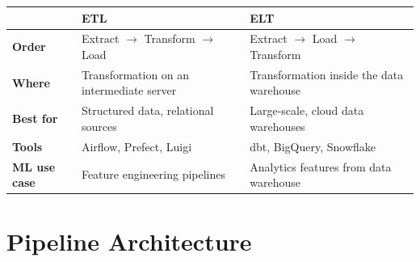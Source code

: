 \begin{center}
\begin{tabular}{@{}lp{5.5cm}p{5.5cm}@{}}
\toprule
& \textbf{ETL} & \textbf{ELT} \\
\midrule
\textbf{Order} & Extract $\to$ Transform $\to$ Load &
  Extract $\to$ Load $\to$ Transform \\
\textbf{Where} & Transformation on an intermediate server &
  Transformation inside the data warehouse \\
\textbf{Best for} & Structured data, relational sources &
  Large-scale, cloud data warehouses \\
\textbf{Tools} & Airflow, Prefect, Luigi &
  dbt, BigQuery, Snowflake \\
\textbf{ML use case} & Feature engineering pipelines &
  Analytics features from data warehouse \\
\bottomrule
\end{tabular}
\end{center}

\section{Pipeline Architecture}
\label{sec:pipeline-architecture}

